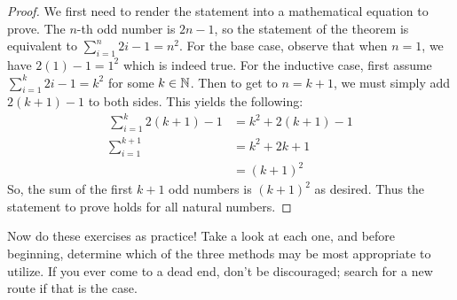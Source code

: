 \vspace{-4mm}
\begin{proof}
    We first need to render the statement into a mathematical equation to prove. The $n$-th odd number is $2n-1$, so the statement of the theorem is equivalent to $\sum_{i=1}^n 2i-1 = n^2$. For the base case, observe that when $n=1$, we have $2(1)-1 = 1^2$ which is indeed true. For the inductive case, first assume $\sum_{i=1}^k 2i-1 = k^2$ for some $k\in\mathbb{N}$. Then to get to $n=k+1$, we must simply add $2(k+1)-1$ to both sides. This yields the following:
    \begin{align*}
        \sum_{i=1}^{k} 2(k+1) - 1 &= k^2 + 2(k+1) - 1 \\
        \sum_{i=1}^{k+1} &= k^2 + 2k + 1 \\
        &= (k+1)^2
    \end{align*}
    So, the sum of the first $k+1$ odd numbers is $(k+1)^2$ as desired. Thus the statement to prove holds for all natural numbers. 
\end{proof}

Now do these exercises as practice! Take a look at each one, and before beginning, determine which of the three methods may be most appropriate to utilize. If you ever come to a dead end, don't be discouraged; search for a new route if that is the case.

